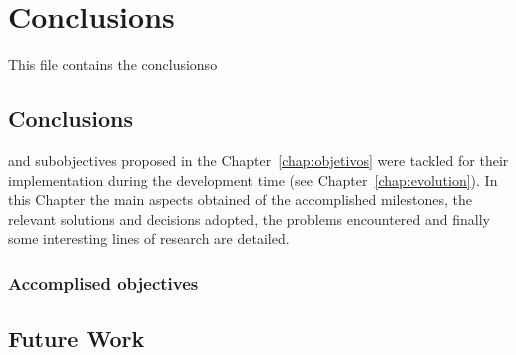 \chapter{Conclusions}
\label{chap:conclusions}
This file contains the conclusionso

\section{Conclusions}

 and subobjectives proposed in the
Chapter~\ref{chap:objetivos} were tackled for their implementation during the
development time (see Chapter~\ref{chap:evolution}). In this Chapter the main
aspects obtained of the accomplished milestones, the relevant solutions and
decisions adopted, the problems encountered and finally some interesting lines
of research are detailed.

\subsection{Accomplised objectives}



\section{Future Work}


